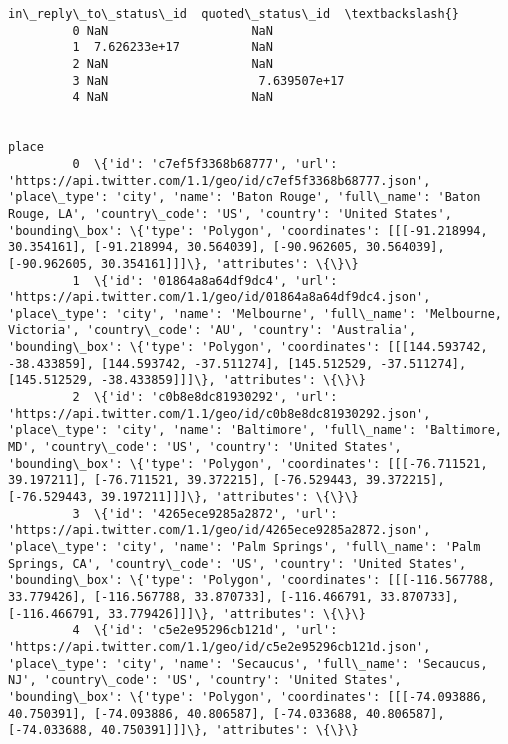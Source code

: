 \documentclass[11pt]{article}
\begin{document}
\begin{Verbatim}[commandchars=\\\{\}]
            in\_reply\_to\_status\_id  quoted\_status\_id  \textbackslash{}
         0 NaN                    NaN                 
         1  7.626233e+17          NaN                 
         2 NaN                    NaN                 
         3 NaN                     7.639507e+17       
         4 NaN                    NaN                 
         
                                                                                                                                                                                                                                                                                                                                                                                                                       place  
         0  \{'id': 'c7ef5f3368b68777', 'url': 'https://api.twitter.com/1.1/geo/id/c7ef5f3368b68777.json', 'place\_type': 'city', 'name': 'Baton Rouge', 'full\_name': 'Baton Rouge, LA', 'country\_code': 'US', 'country': 'United States', 'bounding\_box': \{'type': 'Polygon', 'coordinates': [[[-91.218994, 30.354161], [-91.218994, 30.564039], [-90.962605, 30.564039], [-90.962605, 30.354161]]]\}, 'attributes': \{\}\}        
         1  \{'id': '01864a8a64df9dc4', 'url': 'https://api.twitter.com/1.1/geo/id/01864a8a64df9dc4.json', 'place\_type': 'city', 'name': 'Melbourne', 'full\_name': 'Melbourne, Victoria', 'country\_code': 'AU', 'country': 'Australia', 'bounding\_box': \{'type': 'Polygon', 'coordinates': [[[144.593742, -38.433859], [144.593742, -37.511274], [145.512529, -37.511274], [145.512529, -38.433859]]]\}, 'attributes': \{\}\}      
         2  \{'id': 'c0b8e8dc81930292', 'url': 'https://api.twitter.com/1.1/geo/id/c0b8e8dc81930292.json', 'place\_type': 'city', 'name': 'Baltimore', 'full\_name': 'Baltimore, MD', 'country\_code': 'US', 'country': 'United States', 'bounding\_box': \{'type': 'Polygon', 'coordinates': [[[-76.711521, 39.197211], [-76.711521, 39.372215], [-76.529443, 39.372215], [-76.529443, 39.197211]]]\}, 'attributes': \{\}\}            
         3  \{'id': '4265ece9285a2872', 'url': 'https://api.twitter.com/1.1/geo/id/4265ece9285a2872.json', 'place\_type': 'city', 'name': 'Palm Springs', 'full\_name': 'Palm Springs, CA', 'country\_code': 'US', 'country': 'United States', 'bounding\_box': \{'type': 'Polygon', 'coordinates': [[[-116.567788, 33.779426], [-116.567788, 33.870733], [-116.466791, 33.870733], [-116.466791, 33.779426]]]\}, 'attributes': \{\}\}  
         4  \{'id': 'c5e2e95296cb121d', 'url': 'https://api.twitter.com/1.1/geo/id/c5e2e95296cb121d.json', 'place\_type': 'city', 'name': 'Secaucus', 'full\_name': 'Secaucus, NJ', 'country\_code': 'US', 'country': 'United States', 'bounding\_box': \{'type': 'Polygon', 'coordinates': [[[-74.093886, 40.750391], [-74.093886, 40.806587], [-74.033688, 40.806587], [-74.033688, 40.750391]]]\}, 'attributes': \{\}\}              
\end{Verbatim}
            
\end{document}
